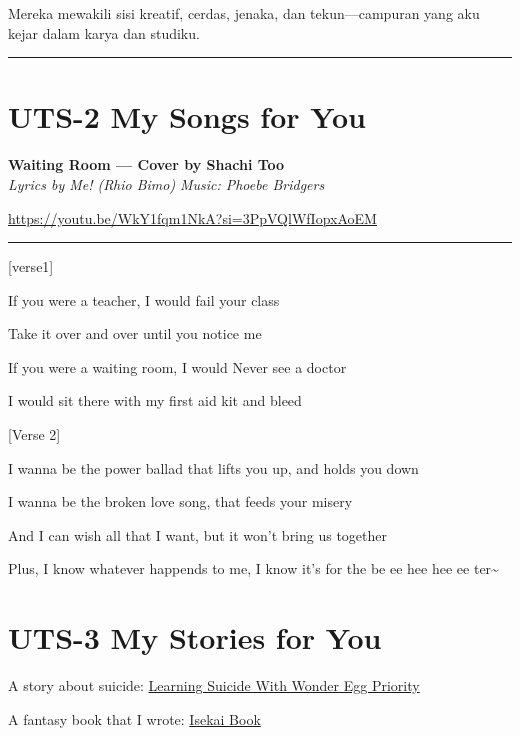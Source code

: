 \documentclass[
  letterpaper,
  DIV=11,
  numbers=noendperiod]{scrreprt}
\begin{document}
Mereka mewakili sisi kreatif, cerdas, jenaka, dan tekun---campuran yang
aku kejar dalam karya dan studiku.

\begin{center}\rule{0.5\linewidth}{0.5pt}\end{center}


\chapter{UTS-2 My Songs for You}\label{uts-2-my-songs-for-you}

\textbf{Waiting Room --- Cover by Shachi Too}\\
\emph{Lyrics by Me! (Rhio Bimo)} \emph{Music: Phoebe Bridgers}

\url{https://youtu.be/WkY1fqm1NkA?si=3PpVQlWfIopxAoEM}

\begin{center}\rule{0.5\linewidth}{0.5pt}\end{center}

{[}verse1{]}

If you were a teacher, I would fail your class

Take it over and over until you notice me

If you were a waiting room, I would Never see a doctor

I would sit there with my first aid kit and bleed

{[}Verse 2{]}

I wanna be the power ballad that lifts you up, and holds you down

I wanna be the broken love song, that feeds your misery

And I can wish all that I want, but it won't bring us together

Plus, I know whatever happends to me, I know it's for the be ee hee hee
ee ter\textasciitilde{}


\chapter{UTS-3 My Stories for You}\label{uts-3-my-stories-for-you}

A story about suicide:
\href{https://roxytea.wixsite.com/tarbyultima/post/wondereggprioritybyultima}{Learning
Suicide With Wonder Egg Priority}

A fantasy book that I wrote:
\href{https://drive.google.com/file/d/1FNOzeGAWfki8vhwjgplE_HTZeMb2h2v2/view?usp=sharing}{Isekai
Book}
\end{document}
